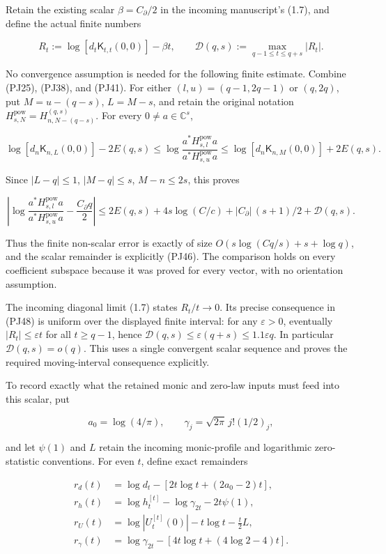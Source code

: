 \documentclass[10pt]{article}
\begin{document}
Retain the existing scalar \(\beta=C_\partial/2\) in the incoming manuscript's (1.7), and define the actual finite numbers

\[
R_t:=\log[d_t\mathsf K_{t,t}(0,0)]-\beta t,
\qquad
\mathcal D(q,s):=\max_{q-1\le t\le q+s}|R_t|.
\tag{PJ46}
\]

No convergence assumption is needed for the following finite estimate. Combine (PJ25), (PJ38), and (PJ41). For either \((l,u)=(q-1,2q-1)\) or \((q,2q)\), put \(M=u-(q-s)\), \(L=M-s\), and retain the original notation \(H^{\mathrm{pow}}_{s,N}=H_{n,N-(q-s)}^{(q,s)}\). For every \(0\ne a\in\mathbb C^s\),

\[
\log[d_n\mathsf K_{n,L}(0,0)]-2E(q,s)
\le\log\frac{a^*H^{\mathrm{pow}}_{s,l}a}{a^*H^{\mathrm{pow}}_{s,u}a}
\le\log[d_n\mathsf K_{n,M}(0,0)]+2E(q,s).
\tag{PJ47}
\]

Since \(|L-q|\le1\), \(|M-q|\le s\), \(M-n\le2s\), this proves

\[
\boxed{
\left|\log\frac{a^*H^{\mathrm{pow}}_{s,l}a}{a^*H^{\mathrm{pow}}_{s,u}a}
-\frac{C_\partial q}{2}\right|
\le2E(q,s)+4s\log(C/c)+|C_\partial|\,(s+1)/2
+\mathcal D(q,s).
}
\tag{PJ48}
\]

Thus the finite non-scalar error is exactly of size \(O(s\log(Cq/s)+s+\log q)\), and the scalar remainder is explicitly (PJ46). The comparison holds on every coefficient subspace because it was proved for every vector, with no orientation assumption.

The incoming diagonal limit (1.7) states \(R_t/t\to0\). Its precise consequence in (PJ48) is uniform over the displayed finite interval: for any \(\varepsilon>0\), eventually \(|R_t|\le\varepsilon t\) for all \(t\ge q-1\), hence \(\mathcal D(q,s)\le\varepsilon(q+s)\le1.1\varepsilon q\). In particular \(\mathcal D(q,s)=o(q)\). This uses a single convergent scalar sequence and proves the required moving-interval consequence explicitly.

To record exactly what the retained monic and zero-law inputs must feed into this scalar, put

\[
a_0=\log(4/\pi),\qquad
\gamma_j=\sqrt{2\pi}\,j!(1/2)_j,
\]

and let \(\psi(1)\) and \(L\) retain the incoming monic-profile and logarithmic zero-statistic conventions. For even \(t\), define exact remainders

\[
\begin{aligned}
r_d(t)&=\log d_t-[2t\log t+(2a_0-2)t],\\
r_h(t)&=\log h_t^{[t]}-\log\gamma_{2t}-2t\psi(1),\\
r_U(t)&=\log|U_t^{[t]}(0)|-t\log t-\tfrac t2L,\\
r_\gamma(t)&=\log\gamma_{2t}-[4t\log t+(4\log2-4)t].
\end{aligned}
\tag{PJ49}
\]
\end{document}
